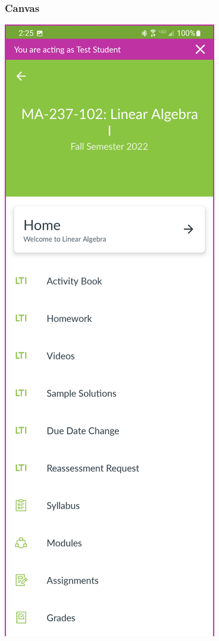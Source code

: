 \documentclass[aspectratio=1610]{beamer}
\begin{document}
\begin{frame}\frametitle{Canvas}
\begin{center}
\includegraphics[height=0.9\textheight]{canvas_menu.jpg}
\end{center}
\end{frame}
\end{document}

